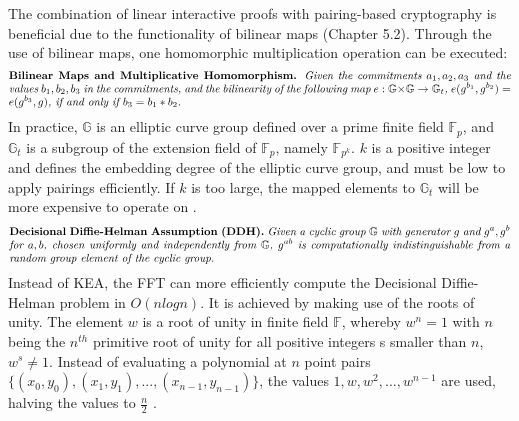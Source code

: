 The combination of linear interactive proofs with pairing-based cryptography is beneficial due to the functionality of bilinear maps (Chapter 5.2). Through the use of bilinear maps, one homomorphic multiplication operation can be executed:
\begin{align*}
    \text{\parbox{450pt}{\textbf{Bilinear Maps and Multiplicative Homomorphism.} \textit{Given the commitments \(a_1, a_2, a_3\) and the values \(b_1, b_2, b_3\) in the commitments, and the bilinearity of the following map \begin{math}
        e: \mathbb{G} \times \mathbb{G} \to \mathbb{G}_t
    \end{math}, \(e(g^{b_1}, g^{b_2}) = e(g^{b_3}, g)\), if and only if \(b_3 = b_1 * b_2\).}}}
\end{align*}
In practice, \begin{math} \mathbb{G} \end{math} is an elliptic curve group defined over a prime finite field \begin{math} \mathbb{F}_p \end{math}, and \begin{math} \mathbb{G}_t \end{math} is a subgroup of the extension field of \begin{math} \mathbb{F}_p \end{math}, namely \begin{math} \mathbb{F}_{p^k} \end{math}. \(k\) is a positive integer and defines the embedding degree of the elliptic curve group, and must be low to apply pairings efficiently. If \(k\) is too large, the mapped elements to \begin{math} \mathbb{G}_t \end{math} will be more expensive to operate on \citep{Thaler}.
\begin{align*}
    \text{\parbox{450pt}{\textbf{Decisional Diffie-Helman Assumption (DDH).} \textit{Given a cyclic group \begin{math}\mathbb{G}\end{math} with generator \(g\) and \(g^a, g^b\) for \(a, b\), chosen uniformly and independently from \begin{math}\mathbb{G}\end{math}, \(g^{ab}\) is computationally indistinguishable from a random group element of the cyclic group.}}}
\end{align*}
Instead of KEA, the FFT can more efficiently compute the Decisional Diffie-Helman problem in \(O(nlogn)\). It is achieved by making use of the roots of unity. The element \(w\) is a root of unity in finite field \begin{math} \mathbb{F}\end{math}, whereby \(w^n = 1\) with \(n\) being the \(n^{th}\) primitive root of unity for all positive integers s smaller than \(n\), \(w^s \neq 1 \). Instead of evaluating a polynomial at \(n\) point pairs \(\{(x_0,y_0), (x_1,y_1), ..., (x_{n-1}, y_{n-1})\}\), the values \(1, w, w^2, ..., w^{n-1}\) are used, halving the values to \(\frac{n}{2}\) \citep{Groth2016OnTS}.


